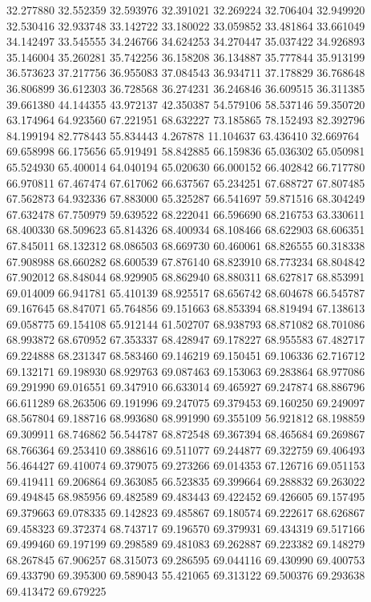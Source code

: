 32.277880
32.552359
32.593976
32.391021
32.269224
32.706404
32.949920
32.530416
32.933748
33.142722
33.180022
33.059852
33.481864
33.661049
34.142497
33.545555
34.246766
34.624253
34.270447
35.037422
34.926893
35.146004
35.260281
35.742256
36.158208
36.134887
35.777844
35.913199
36.573623
37.217756
36.955083
37.084543
36.934711
37.178829
36.768648
36.806899
36.612303
36.728568
36.274231
36.246846
36.609515
36.311385
39.661380
44.144355
43.972137
42.350387
54.579106
58.537146
59.350720
63.174964
64.923560
67.221951
68.632227
73.185865
78.152493
82.392796
84.199194
82.778443
55.834443
4.267878
11.104637
63.436410
32.669764
69.658998
66.175656
65.919491
58.842885
66.159836
65.036302
65.050981
65.524930
65.400014
64.040194
65.020630
66.000152
66.402842
66.717780
66.970811
67.467474
67.617062
66.637567
65.234251
67.688727
67.807485
67.562873
64.932336
67.883000
65.325287
66.541697
59.871516
68.304249
67.632478
67.750979
59.639522
68.222041
66.596690
68.216753
63.330611
68.400330
68.509623
65.814326
68.400934
68.108466
68.622903
68.606351
67.845011
68.132312
68.086503
68.669730
60.460061
68.826555
60.318338
67.908988
68.660282
68.600539
67.876140
68.823910
68.773234
68.804842
67.902012
68.848044
68.929905
68.862940
68.880311
68.627817
68.853991
69.014009
66.941781
65.410139
68.925517
68.656742
68.604678
66.545787
69.167645
68.847071
65.764856
69.151663
68.853394
68.819494
67.138613
69.058775
69.154108
65.912144
61.502707
68.938793
68.871082
68.701086
68.993872
68.670952
67.353337
68.428947
69.178227
68.955583
67.482717
69.224888
68.231347
68.583460
69.146219
69.150451
69.106336
62.716712
69.132171
69.198930
68.929763
69.087463
69.153063
69.283864
68.977086
69.291990
69.016551
69.347910
66.633014
69.465927
69.247874
68.886796
66.611289
68.263506
69.191996
69.247075
69.379453
69.160250
69.249097
68.567804
69.188716
68.993680
68.991990
69.355109
56.921812
68.198859
69.309911
68.746862
56.544787
68.872548
69.367394
68.465684
69.269867
68.766364
69.253410
69.388616
69.511077
69.244877
69.322759
69.406493
56.464427
69.410074
69.379075
69.273266
69.014353
67.126716
69.051153
69.419411
69.206864
69.363085
66.523835
69.399664
69.288832
69.263022
69.494845
68.985956
69.482589
69.483443
69.422452
69.426605
69.157495
69.379663
69.078335
69.142823
69.485867
69.180574
69.222617
68.626867
69.458323
69.372374
68.743717
69.196570
69.379931
69.434319
69.517166
69.499460
69.197199
69.298589
69.481083
69.262887
69.223382
69.148279
68.267845
67.906257
68.315073
69.286595
69.044116
69.430990
69.400753
69.433790
69.395300
69.589043
55.421065
69.313122
69.500376
69.293638
69.413472
69.679225
